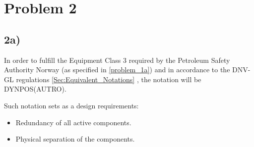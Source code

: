 \section*{Problem 2}
\subsection*{2a)}


In order to fulfill the Equipment Class 3 required by the Petroleum Safety Authority Norway (as specified in \ref{problem_1a}) and in accordance to the DNV-GL regulations \ref{Sec:Equivalent_Notations} \cite{DNV-GL_RP_Dynamic_positioning}, the notation will be DYNPOS(AUTRO).

Such notation sets as a design requirements:

\begin{itemize}
    \item Redundancy of all active components.
    \item Physical separation of the components.
\end{itemize}

